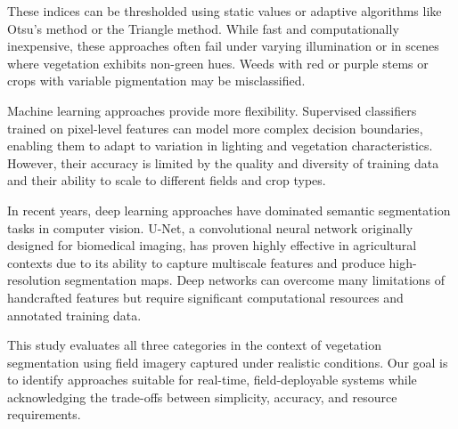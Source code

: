 \documentclass[agriculture,article,submit,pdftex,moreauthors]{Definitions/mdpi}
\begin{document}
These indices can be thresholded using static values or adaptive algorithms like Otsu's method or the Triangle method. While fast and computationally inexpensive, these approaches often fail under varying illumination or in scenes where vegetation exhibits non-green hues. Weeds with red or purple stems or crops with variable pigmentation may be misclassified.

Machine learning approaches provide more flexibility. Supervised classifiers trained on pixel-level features can model more complex decision boundaries, enabling them to adapt to variation in lighting and vegetation characteristics. However, their accuracy is limited by the quality and diversity of training data and their ability to scale to different fields and crop types.

In recent years, deep learning approaches have dominated semantic segmentation tasks in computer vision. U-Net, a convolutional neural network originally designed for biomedical imaging, has proven highly effective in agricultural contexts due to its ability to capture multiscale features and produce high-resolution segmentation maps. Deep networks can overcome many limitations of handcrafted features but require significant computational resources and annotated training data.

This study evaluates all three categories in the context of vegetation segmentation using field imagery captured under realistic conditions. Our goal is to identify approaches suitable for real-time, field-deployable systems while acknowledging the trade-offs between simplicity, accuracy, and resource requirements.
\end{document}
